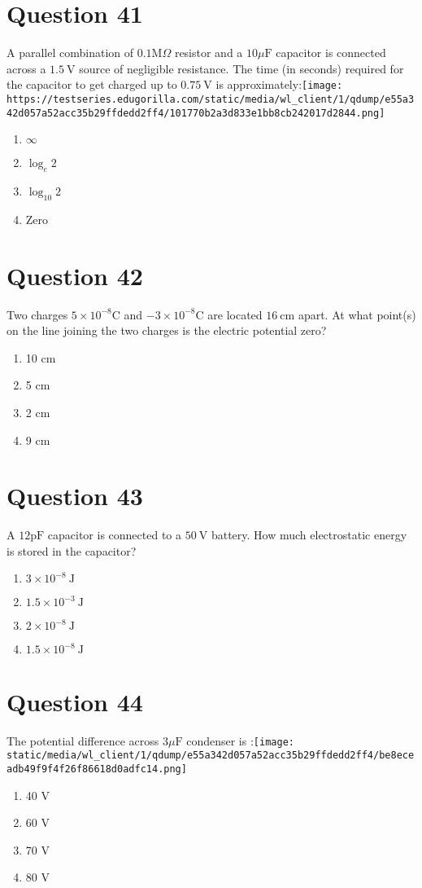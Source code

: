 \documentclass{article}
\begin{document}
\section*{Question 41}
A parallel combination of \(0.1 \mathrm{M} \Omega\) resistor and a \(10 \mu \mathrm{F}\) capacitor is connected across a \(1.5 \mathrm{~V}\) source of negligible resistance. The time (in seconds) required for the capacitor to get charged up to \(0.75 \mathrm{~V}\) is approximately:\texttt{[image: https://testseries.edugorilla.com/static/media/wl\_client/1/qdump/e55a342d057a52acc35b29ffdedd2ff4/101770b2a3d833e1bb8cb242017d2844.png]}
\begin{enumerate}[label=(\alph*)]
\item \(\infty\)
\item \(\log _e 2\)
\item \(\log _{10} 2\)
\item Zero
\end{enumerate}
\newpage
\section*{Question 42}
Two charges \(5 \times 10^{-8} \mathrm{C}\) and \(-3 \times 10^{-8} \mathrm{C}\) are located \(16 \mathrm{~cm}\) apart. At what point(s) on the line joining the two charges is the electric potential zero? 
\begin{enumerate}[label=(\alph*)]
\item 10 cm
\item 5 cm
\item 2 cm
\item 9 cm
\end{enumerate}
\newpage
\section*{Question 43}
A \(12 \mathrm{pF}\) capacitor is connected to a \(50 \mathrm{~V}\) battery. How much electrostatic energy is stored in the capacitor?
\begin{enumerate}[label=(\alph*)]
\item \(3 \times 10^{-8} \mathrm{~J}\)
\item \(1.5 \times 10^{-3} \mathrm{~J}\)
\item \(2 \times 10^{-8} \mathrm{~J}\)
\item \(1.5 \times 10^{-8} \mathrm{~J}\)
\end{enumerate}
\newpage
\section*{Question 44}
The potential difference across \(3 \mu \mathrm{F}\) condenser is :\texttt{[image: static/media/wl\_client/1/qdump/e55a342d057a52acc35b29ffdedd2ff4/be8eceadb49f9f4f26f86618d0adfc14.png]}
\begin{enumerate}[label=(\alph*)]
\item 40 V
\item 60 V
\item 70 V
\item 80 V
\end{enumerate}
\newpage
\end{document}
